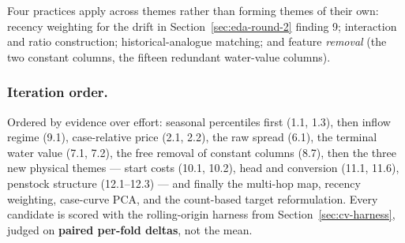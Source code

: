 Four practices apply across themes rather than forming themes of their own: recency weighting for
the drift in Section~\ref{sec:eda-round-2} finding 9; interaction and ratio construction;
historical-analogue matching; and feature \emph{removal} (the two constant columns, the fifteen
redundant water-value columns).

\subsubsection*{Iteration order.} Ordered by evidence over effort: seasonal percentiles first
(1.1, 1.3), then inflow regime (9.1), case-relative price (2.1, 2.2), the raw spread (6.1), the
terminal water value (7.1, 7.2), the free removal of constant columns (8.7), then the three new
physical themes --- start costs (10.1, 10.2), head and conversion (11.1, 11.6), penstock structure
(12.1--12.3) --- and finally the multi-hop map, recency weighting, case-curve PCA, and the
count-based target reformulation. Every candidate is scored with the rolling-origin harness from
Section~\ref{sec:cv-harness}, judged on \textbf{paired per-fold deltas}, not the mean.
